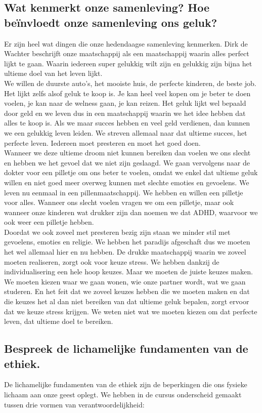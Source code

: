 \documentclass[11pt,a4paper,titlepage]{article}
\begin{document}
\subsection{Wat kenmerkt onze samenleving? Hoe beïnvloedt onze samenleving ons geluk?}
Er zijn heel wat dingen die onze hedendaagse samenleving kenmerken. Dirk de Wachter beschrijft onze maatschappij als een maatschappij waarin alles perfect lijkt te gaan. Waarin iedereen super gelukkig wilt zijn en gelukkig zijn bijna het ultieme doel van het leven lijkt. \\ We willen de duurste auto's, het mooiste huis, de perfecte kinderen, de beste job. Het lijkt zelfs alsof geluk te koop is. Je kan heel veel kopen om je beter te doen voelen, je kan naar de welness gaan, je kan reizen. Het geluk lijkt wel bepaald door geld en we leven dus in een maatschappij waarin we het idee hebben dat alles te koop is. Als we maar succes hebben en veel geld verdienen, dan kunnen we een gelukkig leven leiden. We streven allemaal naar dat ultieme succes, het perfecte leven. Iedereen moet presteren en moet het goed doen. \\
Wanneer we deze ultieme droom niet kunnen bereiken dan voelen we ons slecht en hebben we het gevoel dat we niet zijn geslaagd. We gaan vervolgens naar de dokter voor een pilletje om ons beter te voelen, omdat we enkel dat ultieme geluk willen en niet goed meer overweg kunnen met slechte emoties en gevoelens. We leven nu eenmaal in een pillenmaatschappij. We hebben en willen een pilletje voor alles. Wanneer ons slecht voelen vragen we om een pilletje, maar ook wanneer onze kinderen wat drukker zijn dan noemen we dat ADHD, waarvoor we ook weer een pilletje hebben.  \\
Doordat we ook zoveel met presteren bezig zijn staan we minder stil met gevoelens, emoties en religie. We hebben het paradijs afgeschaft dus we moeten het wel allemaal hier en nu hebben. De drukke maatschappij waarin we zoveel moeten realiseren, zorgt ook voor keuze stress. We hebben dankzij de individualisering een hele hoop keuzes. Maar we moeten de juiste keuzes maken. We moeten kiezen waar we gaan wonen, wie onze partner wordt, wat we gaan studeren. En het feit dat we zoveel keuzes hebben die we moeten maken en dat die keuzes het al dan niet bereiken van dat ultieme geluk bepalen, zorgt ervoor dat we keuze stress krijgen. We weten niet wat we moeten kiezen om dat perfecte leven, dat ultieme doel te bereiken.

\subsection{Bespreek de lichamelijke fundamenten van de ethiek.}
De lichamelijke fundamenten van de ethiek zijn de beperkingen die ons fysieke lichaam aan onze geest oplegt. We hebben in de cursus onderscheid gemaakt tussen drie vormen van verantwoordelijkheid:
\end{document}
